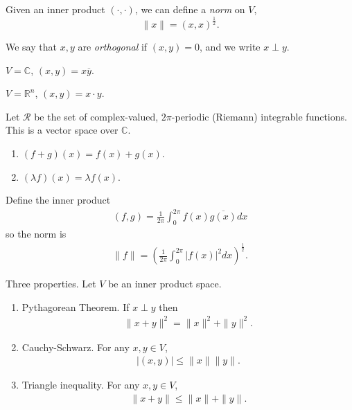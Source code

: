 \documentclass[11pt]{article}
\begin{document}
\begin{definition} Given an inner product $(\cdot, \cdot)$, we can define a \emph{norm} on $V$, $$\| x \| = (x, x)^{\frac{1}{2}}.$$
\end{definition}

\begin{definition} We say that $x, y$ are \emph{orthogonal} if $(x, y) = 0$, and we write $x \perp y$.
\end{definition}

\begin{example} $V = \mathbb{C}$, $(x, y) = x \overline{y}$. 
\end{example}

\begin{example} $V = \mathbb{R}^n$, $(x, y) = x \cdot y$.
\end{example}

\begin{example} Let $\mathcal{R}$ be the set of complex-valued, $2\pi$-periodic (Riemann) integrable functions. This is a vector space over $\mathbb{C}$. \begin{enumerate}
  \item $(f + g)(x) = f(x) + g(x)$.
  \item $(\lambda f)(x) = \lambda f(x)$.
  \end{enumerate}
Define the inner product \begin{align*} (f, g) = \frac{1}{2\pi} \int_0^{2\pi} f(x) \overline{g(x)} dx
\end{align*}
so the norm is \begin{align*} \| f \| = \left( \frac{1}{2\pi} \int_0^{2\pi} |f(x)|^2 dx \right)^{\frac{1}{2}}.
\end{align*}
\end{example}

Three properties. Let $V$ be an inner product space. \begin{enumerate}
  \item Pythagorean Theorem. If $x \perp y$ then \begin{align*} \| x + y \|^2 = \| x\|^2 + \| y \|^2.
  \end{align*}
  \item Cauchy-Schwarz. For any $x, y \in V$, \begin{align*} |(x, y)| \le \| x \|  \| y \|.
  \end{align*}
  \item Triangle inequality. For any $x, y \in V$, \begin{align*} \| x + y \| \le \| x \|  + \| y \|.
  \end{align*}
\end{enumerate}
\end{document}
